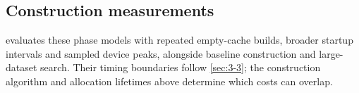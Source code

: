 \subsection{Construction measurements}

 evaluates these phase models with repeated empty-cache
builds, broader startup intervals and sampled device peaks, alongside
baseline construction and large-dataset search. Their timing boundaries
follow \cref{sec:3-3}; the construction algorithm and allocation lifetimes
above determine which costs can overlap.
